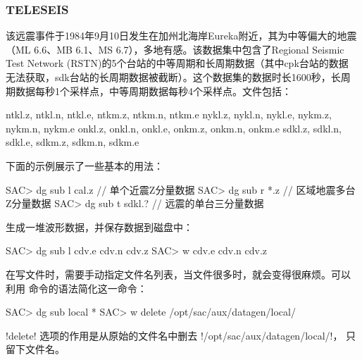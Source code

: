 \subsubsection*{TELESEIS}
该远震事件于1984年9月10日发生在加州北海岸Eureka附近，其为中等偏大的地震
（ML 6.6、MB 6.1、MS 6.7），多地有感。该数据集中包含了Regional Seismic
Test Network (RSTN)的5个台站的中等周期和长周期数据（其中cpk台站的数据
无法获取，sdk台站的长周期数据被截断）。这个数据集的数据时长1600秒，长周
期数据每秒1个采样点，中等周期数据每秒4个采样点。文件包括：
\begin{SACCode}
    ntkl.z, ntkl.n, ntkl.e, ntkm.z, ntkm.n, ntkm.e
    nykl.z, nykl.n, nykl.e, nykm.z, nykm.n, nykm.e
    onkl.z, onkl.n, onkl.e, onkm.z, onkm.n, onkm.e
    sdkl.z, sdkl.n, sdkl.e, sdkm.z, sdkm.n, sdkm.e
\end{SACCode}

下面的示例展示了一些基本的用法：
\begin{SACCode}
SAC> dg sub l cal.z    // 单个近震Z分量数据
SAC> dg sub r *.z      // 区域地震多台Z分量数据
SAC> dg sub t sdkl.?   // 远震的单台三分量数据
\end{SACCode}

生成一堆波形数据，并保存数据到磁盘中：
\begin{SACCode}
SAC> dg sub l cdv.e cdv.n cdv.z
SAC> w cdv.e cdv.n cdv.z
\end{SACCode}
在写文件时，需要手动指定文件名列表，当文件很多时，就会变得很麻烦。可以
利用  命令的语法简化这一命令：
\begin{SACCode}
SAC> dg sub local *
SAC> w delete /opt/sac/aux/datagen/local/
\end{SACCode}
!delete! 选项的作用是从原始的文件名中删去 !/opt/sac/aux/datagen/local/!，
只留下文件名。
